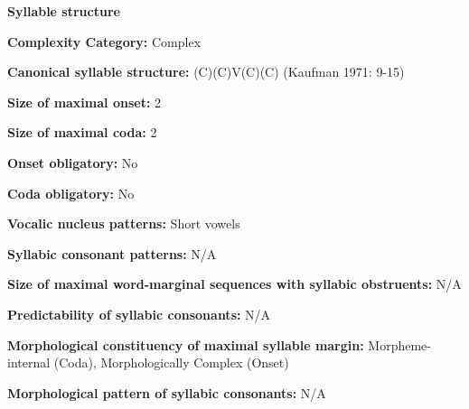 \begin{styleBody}
\textbf{Syllable structure}
\end{styleBody}

\begin{styleBody}
\textbf{Complexity Category:} Complex
\end{styleBody}

\begin{styleBody}
\textbf{Canonical syllable structure:} (C)(C)V(C)(C)\textbf{ }(Kaufman 1971: 9-15)
\end{styleBody}

\begin{styleBody}
\textbf{Size of maximal onset:} 2
\end{styleBody}

\begin{styleBody}
\textbf{Size of maximal coda:} 2
\end{styleBody}

\begin{styleBody}
\textbf{Onset obligatory:} No
\end{styleBody}

\begin{styleBody}
\textbf{Coda obligatory:} No
\end{styleBody}

\begin{styleBody}
\textbf{Vocalic nucleus patterns:} Short vowels
\end{styleBody}

\begin{styleBody}
\textbf{Syllabic consonant patterns:} N/A
\end{styleBody}

\begin{styleBody}
\textbf{Size of maximal word{}-marginal sequences with syllabic obstruents:} N/A
\end{styleBody}

\begin{styleBody}
\textbf{Predictability of syllabic consonants:} N/A
\end{styleBody}

\begin{styleBody}
\textbf{Morphological constituency of maximal syllable margin:} Morpheme-internal (Coda), Morphologically Complex (Onset)
\end{styleBody}

\begin{styleBody}
\textbf{Morphological pattern of syllabic consonants:} N/A
\end{styleBody}

